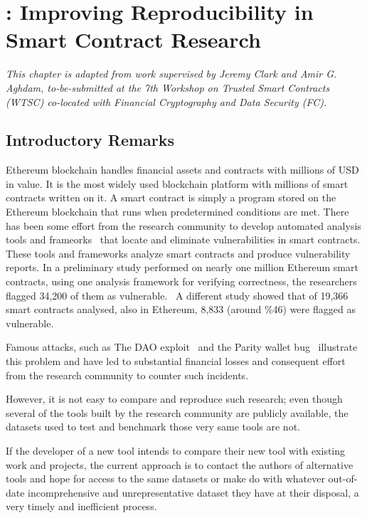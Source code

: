 \chapter{\etherbase: Improving Reproducibility in Smart Contract Research} \label{ch:etherbase}


\textit{
	This chapter is adapted from work supervised by Jeremy Clark and Amir G. Aghdam, to-be-submitted at the 7th Workshop on Trusted Smart Contracts (WTSC) co-located with Financial Cryptography and Data Security (FC).
}

\section{Introductory Remarks}
	\label{sec:intro}
	Ethereum blockchain handles financial assets and contracts with millions of USD in value.
	It is the most widely used blockchain platform with millions of smart contracts written on it.
	A smart contract is simply a program stored on the Ethereum blockchain that runs when predetermined conditions are met.
	There has been some effort from the research community to develop automated analysis tools and frameorks~\cite{ref_tools} that locate and eliminate vulnerabilities in smart contracts.
	These tools and frameworks analyze smart contracts and produce vulnerability reports.
	In a preliminary study performed on nearly one million Ethereum smart contracts, using one analysis framework for verifying correctness, the researchers flagged 34,200 of them as vulnerable.~\cite{ref_flag1}
	A different study showed that of 19,366 smart contracts analysed, also in Ethereum, 8,833 (around \%46) were flagged as vulnerable.~\cite{ref_flag2}

	Famous attacks, such as The DAO exploit~\cite{dao} and the Parity wallet bug~\cite{ref_parity} illustrate this problem and have led to substantial financial losses and consequent effort from the research community to counter such incidents.

	However, it is not easy to compare and reproduce such research; even though several of the tools built by the research community are publicly available, the datasets used to test and benchmark those very same tools are not.

	If the developer of a new tool intends to compare their new tool with existing work and projects, the current approach is to contact the authors of alternative tools and hope for access to the same datasets or make do with whatever out-of-date incomprehensive and unrepresentative dataset they have at their disposal, a very timely and inefficient process.

